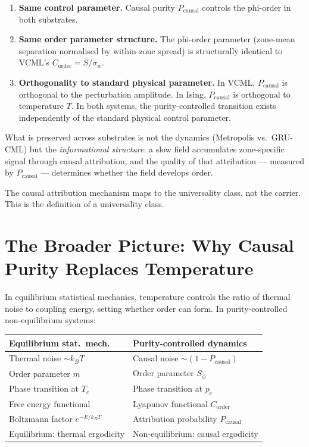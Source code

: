 \documentclass[11pt,a4paper]{article}
\begin{document}
\begin{enumerate}
  \item \textbf{Same control parameter.} Causal purity $P_\mathrm{causal}$
    controls the phi-order in both substrates.
  \item \textbf{Same order parameter structure.} The phi-order parameter
    (zone-mean separation normalised by within-zone spread) is structurally
    identical to VCML's $C_\mathrm{order} = S/\sigma_w$.
  \item \textbf{Orthogonality to standard physical parameter.}
    In VCML, $P_\mathrm{causal}$ is orthogonal to the perturbation amplitude.
    In Ising, $P_\mathrm{causal}$ is orthogonal to temperature $T$.
    In both systems, the purity-controlled transition exists independently of
    the standard physical control parameter.
\end{enumerate}

What is preserved across substrates is not the dynamics (Metropolis vs.\ GRU-CML)
but the \emph{informational structure}: a slow field accumulates zone-specific
signal through causal attribution, and the quality of that attribution
--- measured by $P_\mathrm{causal}$ --- determines whether the field develops order.

The causal attribution mechanism maps to the universality class, not the carrier.
This is the definition of a universality class.

\section{The Broader Picture: Why Causal Purity Replaces Temperature}

In equilibrium statistical mechanics, temperature controls the ratio of
thermal noise to coupling energy, setting whether order can form.
In purity-controlled non-equilibrium systems:

\begin{center}
\begin{tabular}{ll}
\toprule
Equilibrium stat.\ mech. & Purity-controlled dynamics \\
\midrule
Thermal noise $\sim k_B T$ & Causal noise $\sim (1-P_\mathrm{causal})$ \\
Order parameter $m$ & Order parameter $S_\phi$ \\
Phase transition at $T_c$ & Phase transition at $p_c$ \\
Free energy functional & Lyapunov functional $C_\mathrm{order}$ \\
Boltzmann factor $e^{-E/k_BT}$ & Attribution probability $P_\mathrm{causal}$ \\
Equilibrium: thermal ergodicity & Non-equilibrium: causal ergodicity \\
\bottomrule
\end{tabular}
\end{center}
\end{document}
